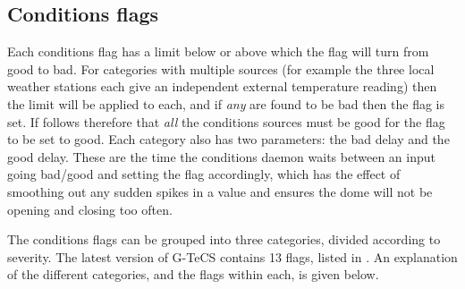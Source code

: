 \subsection{Conditions flags}
\label{sec:conditions_flags}
\begin{colsection}

Each conditions flag has a limit below or above which the flag will turn from good to bad. For categories with multiple sources (for example the three local weather stations each give an independent external temperature reading) then the limit will be applied to each, and if \textit{any} are found to be bad then the flag is set. If follows therefore that \textit{all} the conditions sources must be good for the flag to be set to good. Each category also has two parameters: the bad delay and the good delay. These are the time the conditions daemon waits between an input going bad/good and setting the flag accordingly, which has the effect of smoothing out any sudden spikes in a value and ensures the dome will not be opening and closing too often.

The conditions flags can be grouped into three categories, divided according to severity. The latest version of G-TeCS contains 13 flags, listed in . An explanation of the different categories, and the flags within each, is given below.


\end{colsection}
